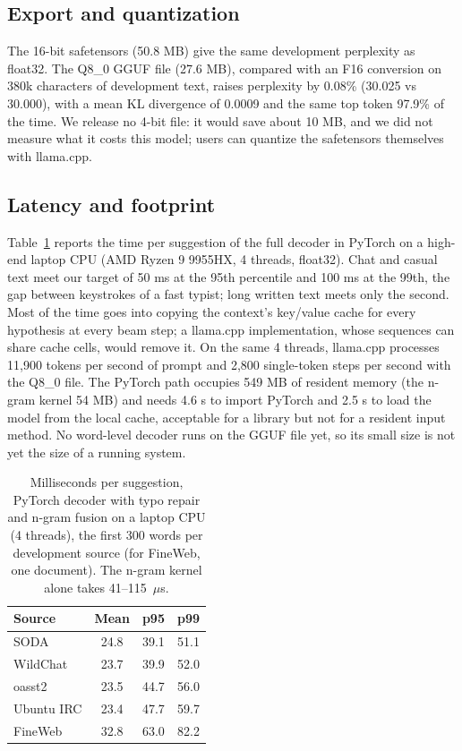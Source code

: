 \documentclass[11pt]{article}
\begin{document}
\subsection{Export and quantization}

The 16-bit safetensors (50.8 MB) give the same development perplexity as float32. The Q8\_0 GGUF file (27.6 MB),
compared with an F16 conversion on 380k characters of development text, raises perplexity by 0.08\% (30.025 vs
30.000), with a mean KL divergence of 0.0009 and the same top token 97.9\% of the time. We release no 4-bit file: it
would save about 10 MB, and we did not measure what it costs this model; users can quantize the safetensors
themselves with llama.cpp.

\subsection{Latency and footprint}

Table~\ref{tab:latency} reports the time per suggestion of the full decoder in PyTorch on a high-end laptop CPU (AMD
Ryzen 9 9955HX, 4 threads, float32). Chat and casual text meet our target of 50 ms at the 95th percentile and 100 ms
at the 99th, the gap between keystrokes of a fast typist; long written text meets only the second. Most of the time
goes into copying the context's key/value cache for every hypothesis at every beam step; a llama.cpp implementation,
whose sequences can share cache cells, would remove it. On the same 4 threads, llama.cpp processes 11,900 tokens per
second of prompt and 2,800 single-token steps per second with the Q8\_0 file. The PyTorch path occupies 549 MB of
resident memory (the n-gram kernel 54 MB) and needs 4.6 s to import PyTorch and 2.5 s to load the model from the
local cache, acceptable for a library but not for a resident input method. No word-level decoder runs on the GGUF
file yet, so its small size is not yet the size of a running system.

\begin{table}[t]
\centering
\small
\begin{tabular}{@{}lccc@{}}
\toprule
Source & Mean & p95 & p99 \\
\midrule
SODA & 24.8 & 39.1 & 51.1 \\
WildChat & 23.7 & 39.9 & 52.0 \\
oasst2 & 23.5 & 44.7 & 56.0 \\
Ubuntu IRC & 23.4 & 47.7 & 59.7 \\
FineWeb & 32.8 & 63.0 & 82.2 \\
\bottomrule
\end{tabular}
\caption{Milliseconds per suggestion, PyTorch decoder with typo repair and n-gram fusion on a laptop CPU (4
threads), the first 300 words per development source (for FineWeb, one document). The n-gram kernel alone takes
41--115~$\mu$s.}
\label{tab:latency}
\end{table}
\end{document}
